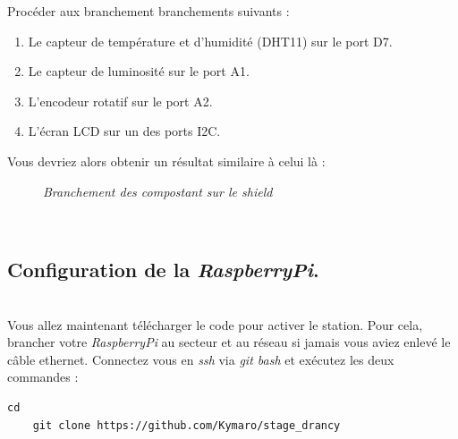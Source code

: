 Procéder aux branchement branchements suivants :
\begin{enumerate}
	\item Le capteur de température et d'humidité (DHT11) sur le port D7.
	\item Le capteur de luminosité sur le port A1.
	\item L'encodeur rotatif sur le port A2.
	\item L'écran LCD sur un des ports I2C.
\end{enumerate}
Vous devriez alors obtenir un résultat similaire à celui là :
	\begin{figure}[H]
	\begin{center}
	\end{center}
		\caption{ \textit{Branchement des compostant sur le shield}}
	\end{figure}\\

\subsection{Configuration de la \textit{RaspberryPi}.}\\

Vous allez maintenant télécharger le code pour activer le station. Pour cela, brancher votre \textit{RaspberryPi} au secteur et au réseau si jamais vous aviez enlevé le câble ethernet. Connectez vous en \textit{ssh} via \textit{git bash} et exécutez les deux commandes :\\
		\begin{lstlisting}[style=MyBashStyle]
	cd
	git clone https://github.com/Kymaro/stage_drancy
		\end{lstlisting}\\

